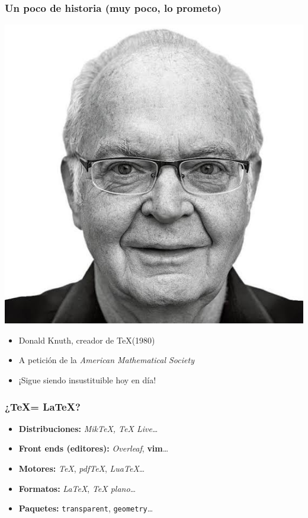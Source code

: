\begin{frame}
    \frametitle{Un poco de historia (muy poco, lo prometo)}
    \begin{minipage}[c]{0.45\textwidth}
        \includegraphics[width=\textwidth]{images/knuth.jpeg}
    \end{minipage}
    \hfill
    \begin{minipage}[c]{0.45\textwidth}
        \begin{itemize}
            \item{Donald Knuth, creador de \TeX (1980)}
            \item{A petición de la \emph{American Mathematical Society}}
            \item{¡Sigue siendo insustituible hoy en día!}
        \end{itemize}
    \end{minipage}
\end{frame}

\begin{frame}
\frametitle{¿\TeX = \LaTeX?}
\begin{itemize}
    \item{\textbf{Distribuciones:} \emph{MikTeX, TeX Live\dots}}
    \item{\textbf{Front ends (editores):} \emph{Overleaf}, \textbf{vim}\dots}
    \item{\textbf{Motores:} \emph{TeX}, \emph{pdfTeX}, \emph{LuaTeX}\dots}
    \item{\textbf{Formatos:} \emph{LaTeX}, \emph{TeX plano}\dots}
    \item{\textbf{Paquetes:} \texttt{transparent}, \texttt{geometry}\dots}
\end{itemize}
\end{frame}
